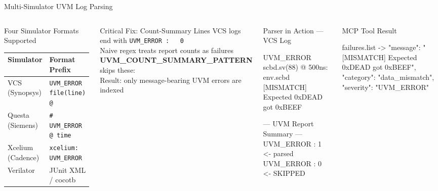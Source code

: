 \documentclass[aspectratio=169,t]{beamer}
\begin{document}
\begin{frame}[fragile]{Multi-Simulator UVM Log Parsing}
  \begin{columns}[T]
      \begin{block}{Four Simulator Formats Supported}
        \small
        \begin{tabular}{ll}
          \toprule
          \textbf{Simulator} & \textbf{Format Prefix} \\
          \midrule
          VCS (Synopsys) & \texttt{UVM\_ERROR file(line) @} \\
          Questa (Siemens) & \texttt{\# UVM\_ERROR @ time} \\
          Xcelium (Cadence) & \texttt{xcelium: UVM\_ERROR} \\
          Verilator & JUnit XML / cocotb \\
          \bottomrule
        \end{tabular}
      \end{block}
      \vspace{0.4em}
      \begin{alertblock}{Critical Fix: Count-Summary Lines}
        \small
        VCS logs end with \texttt{UVM\_ERROR :\ \ \ 0}\\
        Naive regex treats report counts as failures\\[4pt]
        \textbf{UVM\_COUNT\_SUMMARY\_PATTERN} skips these:\\
        Result: only message-bearing UVM errors are indexed
      \end{alertblock}

      \begin{exampleblock}{Parser in Action — VCS Log}
\begin{semiverbatim}\color{white}
UVM_ERROR scbd.sv(88) @ 500ns:
  env.scbd [MISMATCH]
  Expected 0xDEAD got 0xBEEF

--- UVM Report Summary ---
UVM_ERROR :    1   <- parsed
UVM_ERROR :    0   <- SKIPPED
\end{semiverbatim}
      \end{exampleblock}
      \vspace{0.3em}
      \begin{exampleblock}{MCP Tool Result}
\begin{semiverbatim}\color{white}
failures.list -> {
  "message": "[MISMATCH] Expected
    0xDEAD got 0xBEEF",
  "category": "data_mismatch",
  "severity": "UVM_ERROR"
}
\end{semiverbatim}
      \end{exampleblock}
  \end{columns}
\end{frame}
\end{document}
